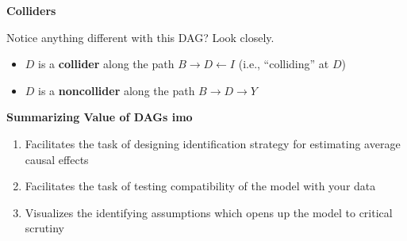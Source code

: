 \documentclass[notes=show]{beamer}
\begin{document}
\begin{frame}[plain]
\begin{center}
\textbf{Colliders}
\end{center}

\begin{center}
\end{center}	

Notice anything different with this DAG?  Look closely.
\begin{itemize}

		\item $D$ is a \textbf{collider} along the path $B\rightarrow D\leftarrow I$ (i.e., ``colliding'' at $D$)
		\item $D$ is a \textbf{noncollider} along the path $B\rightarrow D\rightarrow Y$

\end{itemize}

\end{frame}


\begin{frame}[plain]
\begin{center}
\textbf{Summarizing Value of DAGs imo}
\end{center}

\begin{enumerate}
\item Facilitates the task of designing identification strategy for estimating average causal effects
\item Facilitates the task of testing compatibility of the model with your data
\item Visualizes the identifying assumptions which opens up the model to critical scrutiny
\end{enumerate}

\end{frame}
\end{document}
